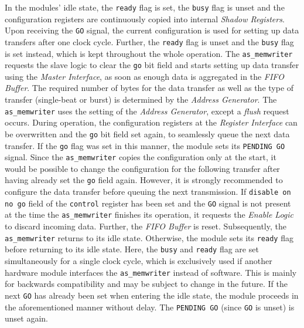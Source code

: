 In the modules' idle state, the \texttt{ready} flag is set, the \texttt{busy} flag is unset and the configuration registers are continuously copied into internal \textit{Shadow Registers}.
Upon receiving the \texttt{GO} signal, the current configuration is used for setting up data transfers after one clock cycle.
Further, the \texttt{ready} flag is unset and the \texttt{busy} flag is set instead, which is kept throughout the whole operation.
The \texttt{as\_memwriter} requests the slave logic to clear the \texttt{go} bit field and starts setting up data transfer using the \textit{Master Interface}, as soon as enough data is aggregated in the \textit{FIFO Buffer}.
The required number of bytes for the data transfer as well as the type of transfer (single-beat or burst) is determined by the \textit{Address Generator}.
The \texttt{as\_memwriter} uses the setting of the \textit{Address Generator}, except a \textit{flush} request occurs.
During operation, the configuration registers at the \textit{Register Interface} can be overwritten and the \texttt{go} bit field set again, to seamlessly queue the next data transfer.
If the \texttt{go} flag was set in this manner, the module sets its \texttt{PENDING GO} signal.
Since the \texttt{as\_memwriter} copies the configuration only at the start, it would be possible to change the configuration for the following transfer after having already set the \texttt{go} field again.
However, it is strongly recommended to configure the data transfer before queuing the next transmission.
If \texttt{disable on no go} field of the \texttt{control} register has been set and the \texttt{GO} signal is not present at the time the \texttt{as\_memwriter} finishes its operation, it requests the \textit{Enable Logic} to discard incoming data.
Further, the \textit{FIFO Buffer} is reset.
Subsequently, the \texttt{as\_memwriter} returns to its idle state.
Otherwise, the module sets its \texttt{ready} flag before returning to its idle state.
Here, the \texttt{busy} and \texttt{ready} flag are set simultaneously for a single clock cycle, which is exclusively used if another hardware module interfaces the \texttt{as\_memwriter} instead of software.
This is mainly for backwards compatibility and may be subject to change in the future.
If the next \texttt{GO} has already been set when entering the idle state, the module proceeds in the aforementioned manner without delay.
The \texttt{PENDING GO} (since \texttt{GO} is unset) is unset again.


